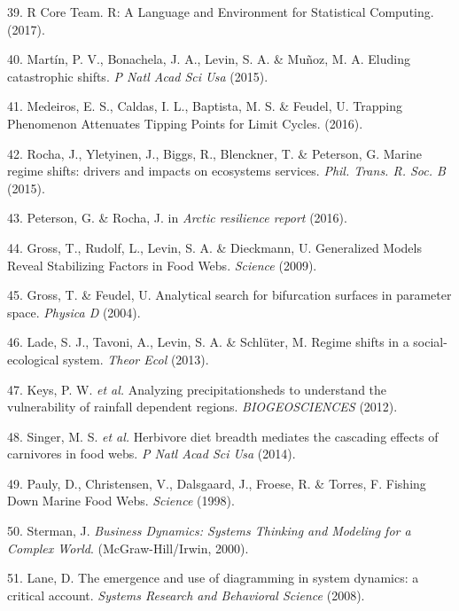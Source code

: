 \documentclass[9pt,]{article}
\begin{document}
\hypertarget{ref-RCoreTeam:2012wf}{}
39. R Core Team. R: A Language and Environment for Statistical
Computing. (2017).

\hypertarget{ref-Martin:2015kl}{}
40. Martín, P. V., Bonachela, J. A., Levin, S. A. \& Muñoz, M. A.
Eluding catastrophic shifts. \emph{P Natl Acad Sci Usa} (2015).

\hypertarget{ref-Medeiros:2016vf}{}
41. Medeiros, E. S., Caldas, I. L., Baptista, M. S. \& Feudel, U.
Trapping Phenomenon Attenuates Tipping Points for Limit Cycles. (2016).

\hypertarget{ref-Rocha:2015eea}{}
42. Rocha, J., Yletyinen, J., Biggs, R., Blenckner, T. \& Peterson, G.
Marine regime shifts: drivers and impacts on ecosystems services.
\emph{Phil. Trans. R. Soc. B} (2015).

\hypertarget{ref-Peterson:2016ul}{}
43. Peterson, G. \& Rocha, J. in \emph{Arctic resilience report} (2016).

\hypertarget{ref-Gross:2009jr}{}
44. Gross, T., Rudolf, L., Levin, S. A. \& Dieckmann, U. Generalized
Models Reveal Stabilizing Factors in Food Webs. \emph{Science} (2009).

\hypertarget{ref-Gross:2004uu}{}
45. Gross, T. \& Feudel, U. Analytical search for bifurcation surfaces
in parameter space. \emph{Physica D} (2004).

\hypertarget{ref-Lade:2013iwa}{}
46. Lade, S. J., Tavoni, A., Levin, S. A. \& Schlüter, M. Regime shifts
in a social-ecological system. \emph{Theor Ecol} (2013).

\hypertarget{ref-Keys:2012bo}{}
47. Keys, P. W. \emph{et al.} Analyzing precipitationsheds to understand
the vulnerability of rainfall dependent regions. \emph{BIOGEOSCIENCES}
(2012).

\hypertarget{ref-Singer:2014gj}{}
48. Singer, M. S. \emph{et al.} Herbivore diet breadth mediates the
cascading effects of carnivores in food webs. \emph{P Natl Acad Sci Usa}
(2014).

\hypertarget{ref-Pauly:1998iw}{}
49. Pauly, D., Christensen, V., Dalsgaard, J., Froese, R. \& Torres, F.
Fishing Down Marine Food Webs. \emph{Science} (1998).

\hypertarget{ref-Sterman:2000we}{}
50. Sterman, J. \emph{Business Dynamics: Systems Thinking and Modeling
for a Complex World}. (McGraw-Hill/Irwin, 2000).

\hypertarget{ref-Lane:2008p6781}{}
51. Lane, D. The emergence and use of diagramming in system dynamics: a
critical account. \emph{Systems Research and Behavioral Science} (2008).
\end{document}
